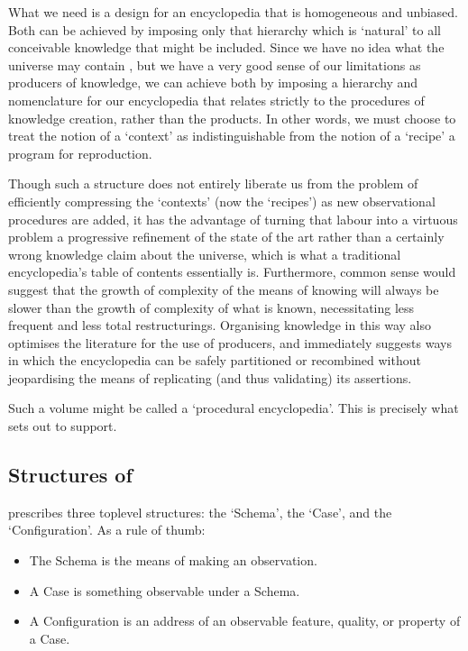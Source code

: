 \documentclass[letterpaper,10pt,english]{jupyterBook}
\begin{document}
\sphinxAtStartPar
What we need is a design for an encyclopedia that is homogeneous and unbiased. Both can be achieved by imposing only that hierarchy which is ‘natural’ to all conceivable knowledge that might be included. Since we have no idea what the universe may contain , but we have a very good sense of our limitations as producers of knowledge, we can achieve both by imposing a hierarchy and nomenclature for our encyclopedia that relates strictly to the procedures of knowledge creation, rather than the products. In other words, we must choose to treat the notion of a ‘context’ as indistinguishable from the notion of a ‘recipe’ \sphinxhyphen{} a program for reproduction.

\sphinxAtStartPar
Though such a structure does not entirely liberate us from the problem of efficiently compressing the ‘contexts’ (now the ‘recipes’) as new observational procedures are added, it has the advantage of turning that labour into a virtuous problem \sphinxhyphen{} a progressive refinement of the state of the art \sphinxhyphen{} rather than a certainly wrong knowledge claim about the universe, which is what a traditional encyclopedia’s table of contents essentially is. Furthermore, common sense would suggest that the growth of complexity of the means of knowing will always be slower than the growth of complexity of what is known, necessitating less frequent and less total restructurings. Organising knowledge in this way also optimises the literature for the use of producers, and immediately suggests ways in which the encyclopedia can be safely partitioned or recombined without jeopardising the means of replicating (and thus validating) its assertions.

\sphinxAtStartPar
Such a volume might be called a ‘procedural encyclopedia’. This is precisely what  sets out to support.


\subsection{Structures of }
\label{\detokenize{content/chapter_03_everest/doctrine:structures-of-akp}}
\sphinxAtStartPar
{} prescribes three top\sphinxhyphen{}level structures: the ‘Schema’, the ‘Case’, and the ‘Configuration’. As a rule of thumb:
\begin{itemize}
\item {} 
\sphinxAtStartPar
The Schema is the means of making an observation.

\item {} 
\sphinxAtStartPar
A Case is something observable under a Schema.

\item {} 
\sphinxAtStartPar
A Configuration is an address of an observable feature, quality, or property of a Case.

\end{itemize}
\end{document}
